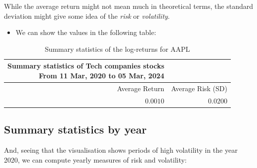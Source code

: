 \documentclass[
  12pt]{article}
\providecommand{\tightlist}{%
  \setlength{\itemsep}{0pt}\setlength{\parskip}{0pt}}\usepackage{longtable,booktabs,array}
\theoremstyle{definition}
\theoremstyle{remark}
\begin{document}
\begin{tcolorbox}[enhanced jigsaw, titlerule=0mm, toptitle=1mm, bottomrule=.15mm, left=2mm, arc=.35mm, colframe=quarto-callout-caution-color-frame, rightrule=.15mm, opacityback=0, coltitle=black, colbacktitle=quarto-callout-caution-color!10!white, title=\textcolor{quarto-callout-caution-color}{\faFire}\hspace{0.5em}{A word of warning}, bottomtitle=1mm, breakable, leftrule=.75mm, colback=white, opacitybacktitle=0.6, toprule=.15mm]

While the average return might not mean much in theoretical terms, the
standard deviation might give some idea of the \emph{risk} or
\emph{volatility}.

\end{tcolorbox}

\begin{itemize}
\tightlist
\item
  We can show the values in the following table:
\end{itemize}

\begin{longtable}{rr}

\caption{\label{tbl-summary-aapl}Summary statistics of the log-returns
for AAPL}

\tabularnewline

\caption*{
{\large Summary statistics of Tech companies stocks} \\
{\small From 11 Mar, 2020 to 05 Mar, 2024}
} \\
\toprule
Average Return & Average Risk (SD) \\
\midrule\addlinespace[2.5pt]
$0.0010$ & $0.0200$ \\
\bottomrule

\end{longtable}

\subsection{Summary statistics by
year}\label{summary-statistics-by-year}

And, seeing that the visualisation shows periods of high volatility in
the year 2020, we can compute yearly measures of risk and volatility:
\end{document}
